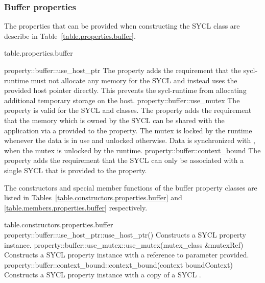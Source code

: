 \subsubsection{Buffer properties}
\label{sec:buffer-properties}

The properties that can be provided when constructing the SYCL  class are describe in Table~\ref{table.properties.buffer}.

 {table.properties.buffer}

\addRow
  { property::buffer::use_host_ptr }
  {
    The  property adds the requirement that the \gls{sycl-runtime} must not allocate any memory for the SYCL  and instead uses the provided host pointer directly. This prevents the \gls{sycl-runtime} from allocating additional temporary storage on the host.
  }
\addRow
  { property::buffer::use_mutex }
  {
    The  property is valid for the SYCL  and  classes. The property adds the requirement that the memory which is owned by the SYCL  can be shared with the application via a  provided to the property. The mutex  is locked by the runtime whenever the data is in use and unlocked otherwise. Data is synchronized with , when the mutex is unlocked by the runtime.
  }
\addRow
  { property::buffer::context_bound }
  {
    The  property adds the requirement that the SYCL  can only be associated with a single SYCL  that is provided to the property.
  }
\completeTable

The constructors and special member functions of the buffer property
classes are listed in
Tables~\ref{table.constructors.properties.buffer} and
\ref{table.members.properties.buffer} respectively.

{table.constructors.properties.buffer}
\addRow
{property::buffer::use_host_ptr::use_host_ptr()}
{
  Constructs a SYCL  property instance.
}
\addRow
{property::buffer::use_mutex::use_mutex(mutex_class \&mutexRef)}
{
  Constructs a SYCL  property instance with a reference to  parameter provided.
}
\addRow
{property::buffer::context_bound::context_bound(context boundContext)}
{
  Constructs a SYCL  property instance with a copy of a SYCL .
}
\completeTable

